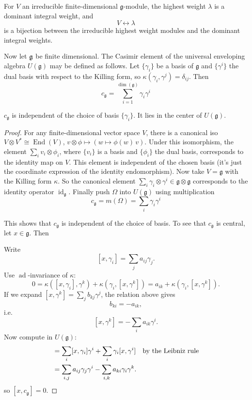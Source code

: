 \documentclass[12pt]{article}
\begin{document}
\begin{corollary}[Weyl]
    For $V$ an irreducible finite-dimensional $\mathfrak{g}$-module, the highest
    weight $\lambda$ is a dominant integral weight, and
    \[
        V \longleftrightarrow \lambda
    \]
    is a bijection between the irreducible highest weight modules and the
    dominant integral weights.
\end{corollary}

Now let $\mathfrak{g}$ be finite dimensional. The Casimir element of the universal enveloping algebra $U(\mathfrak{g})$ may be defined as follows. Let $\{\gamma_i\}$ be a basis of $\mathfrak{g}$ and $\{\gamma^i\}$ the dual basis with respect
to the Killing form, so $\kappa(\gamma_i, \gamma^j) = \delta_{ij}$. Then
\[
    c_{\mathfrak{g}} = \sum_{i=1}^{\dim(\mathfrak{g})} \gamma_i \gamma^i
\]

\begin{proposition}
    $c_{\mathfrak{g}}$ is independent of the choice of basis $\{\gamma_i\}$.
    It lies in the center of $U(\mathfrak{g})$.
\end{proposition}

\begin{proof}
    For any finite-dimensional vector space $V$, there is a canonical iso
    $V \otimes V^* \cong \operatorname{End}(V)$, $v\otimes \phi \mapsto (w \mapsto \phi(w)\,v)$. Under this isomorphism, the element $\sum_i v_i \otimes \phi_i$, where $\{v_i\}$ is a basis and $\{\phi_i\}$ the dual basis, corresponds to the identity map on $V$. This element is independent of the chosen basis (it's just the coordinate expression of the identity endomorphism). Now take $V = \mathfrak{g}$ with the Killing form $\kappa$. So the canonical element $\sum_i \gamma_i \otimes \gamma^i \in \mathfrak{g} \otimes \mathfrak{g}$ corresponds to the identity operator $\operatorname{id}_{\mathfrak{g}}$. Finally push $\Omega$ into $U(\mathfrak{g})$ using multiplication \[c_{\mathfrak{g}} = m(\Omega) = \sum_i \gamma_i \gamma^i\]

    This shows that $c_{\mathfrak{g}}$ is independent of the choice of basis. To see that $c_{\mathfrak{g}}$ is central, let $x \in \mathfrak{g}$. Then

    Write
    \[
        [x, \gamma_i] = \sum_j a_{ij} \gamma_j.
    \]
    Use $\operatorname{ad}$-invariance of $\kappa$:
    \[
        0 = \kappa([x, \gamma_i], \gamma^k) + \kappa(\gamma_i, [x, \gamma^k])
        = a_{ik} + \kappa(\gamma_i, [x, \gamma^k]).
    \]
    If we expand $[x, \gamma^k] = \sum_j b_{kj} \gamma^j$, the relation above gives
    \[
        b_{ki} = -a_{ik},
    \]
    i.e.
    \[
        [x, \gamma^k] = -\sum_i a_{ik} \gamma^i.
    \]
    Now compute in $U(\mathfrak{g})$:
    \begin{align*}
        [x, c_{\mathfrak{g}}]
         & = \sum_i [x, \gamma_i] \gamma^i + \sum_i \gamma_i [x, \gamma^i] \texty{by the Leibniz rule} \\
         & = \sum_{i, j} a_{ij} \gamma_j \gamma^i - \sum_{i, k} a_{ki} \gamma_i \gamma^k.
    \end{align*}
    so $[x, c_{\mathfrak{g}}] = 0$.
\end{proof}
\end{document}
